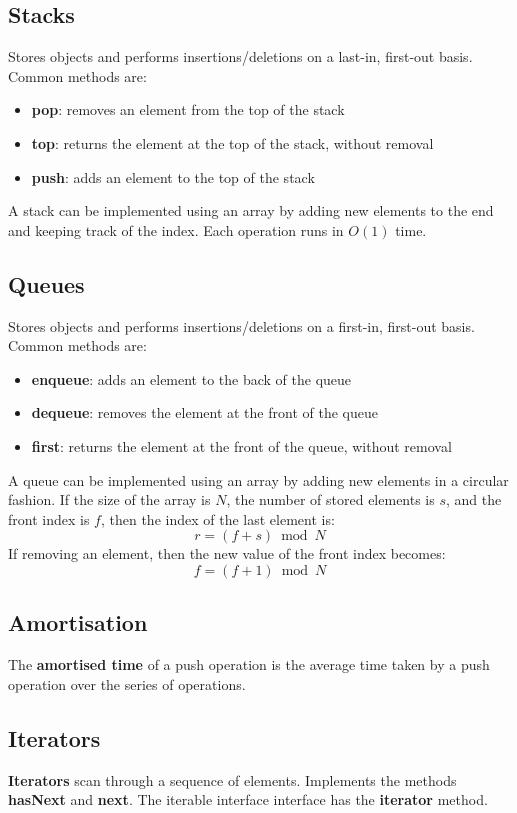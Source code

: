 \documentclass[12pt]{extarticle}
\newcommand{\N}{\newline\newline}
\begin{document}
	\subsection{Stacks}
	Stores objects and performs insertions/deletions on a last-in, first-out basis.\N
	Common methods are:
	\begin{itemize}
		\item \textbf{pop}: removes an element from the top of the stack
		\item \textbf{top}: returns the element at the top of the stack, without removal
		\item \textbf{push}: adds an element to the top of the stack
	\end{itemize}
	A stack can be implemented using an array by adding new elements to the end and keeping track of the index.\N
	Each operation runs in $O(1)$ time.
	\subsection{Queues}
	Stores objects and performs insertions/deletions on a first-in, first-out basis.\N
	Common methods are:
	\begin{itemize}
		\item \textbf{enqueue}: adds an element to the back of the queue
		\item \textbf{dequeue}: removes the element at the front of the queue 
		\item \textbf{first}: returns the element at the front of the queue, without removal
	\end{itemize}
	A queue can be implemented using an array by adding new elements in a circular fashion.\N
	If the size of the array is $N$, the number of stored elements is $s$, and the front index is $f$, then the index of the last element is:
	\begin{equation*}
		r = (f + s)\bmod{N}
	\end{equation*}
	If removing an element, then the new value of the front index becomes:
	\begin{equation*}
		f = (f+1)\bmod{N}
	\end{equation*}
	\subsection{Amortisation}
	The \textbf{amortised time} of a push operation is the average time taken by a push operation over the series of operations.
	\subsection{Iterators}
	\textbf{Iterators} scan through a sequence of elements. Implements the methods \textbf{hasNext} and \textbf{next}.\N
	The iterable interface interface has the \textbf{iterator} method.
	\newpage
\end{document}
